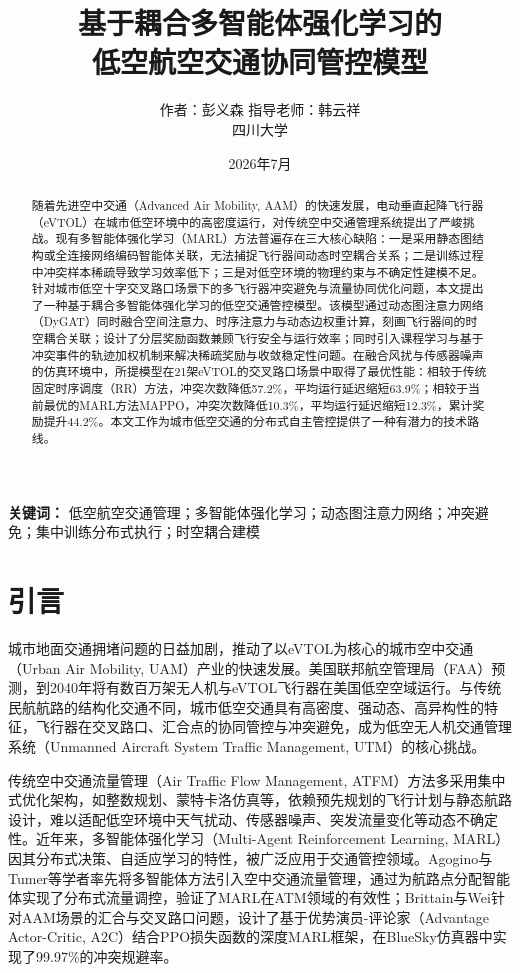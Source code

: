 \documentclass[12pt,a4paper,UTF8]{ctexart}
\title{\textbf{基于耦合多智能体强化学习的\\低空航空交通协同管控模型}}
\author{作者：彭义森 \quad 指导老师：韩云祥 \\ 四川大学}
\date{2026年7月}
\begin{document}
\maketitle

\begin{abstract}
随着先进空中交通（Advanced Air Mobility, AAM）的快速发展，电动垂直起降飞行器（eVTOL）在城市低空环境中的高密度运行，对传统空中交通管理系统提出了严峻挑战。现有多智能体强化学习（MARL）方法普遍存在三大核心缺陷：一是采用静态图结构或全连接网络编码智能体关联，无法捕捉飞行器间动态时空耦合关系；二是训练过程中冲突样本稀疏导致学习效率低下；三是对低空环境的物理约束与不确定性建模不足。针对城市低空十字交叉路口场景下的多飞行器冲突避免与流量协同优化问题，本文提出了一种基于耦合多智能体强化学习的低空交通管控模型。该模型通过动态图注意力网络（DyGAT）同时融合空间注意力、时序注意力与动态边权重计算，刻画飞行器间的时空耦合关联；设计了分层奖励函数兼顾飞行安全与运行效率；同时引入课程学习与基于冲突事件的轨迹加权机制来解决稀疏奖励与收敛稳定性问题。在融合风扰与传感器噪声的仿真环境中，所提模型在21架eVTOL的交叉路口场景中取得了最优性能：相较于传统固定时序调度（RR）方法，冲突次数降低57.2\%，平均运行延迟缩短63.9\%；相较于当前最优的MARL方法MAPPO，冲突次数降低10.3\%，平均运行延迟缩短12.3\%，累计奖励提升44.2\%。本文工作为城市低空交通的分布式自主管控提供了一种有潜力的技术路线。
\end{abstract}

\noindent \textbf{关键词：} 低空航空交通管理；多智能体强化学习；动态图注意力网络；冲突避免；集中训练分布式执行；时空耦合建模

\section{引言}
城市地面交通拥堵问题的日益加剧，推动了以eVTOL为核心的城市空中交通（Urban Air Mobility, UAM）产业的快速发展。美国联邦航空管理局（FAA）预测，到2040年将有数百万架无人机与eVTOL飞行器在美国低空空域运行。与传统民航航路的结构化交通不同，城市低空交通具有高密度、强动态、高异构性的特征，飞行器在交叉路口、汇合点的协同管控与冲突避免，成为低空无人机交通管理系统（Unmanned Aircraft System Traffic Management, UTM）的核心挑战。

传统空中交通流量管理（Air Traffic Flow Management, ATFM）方法多采用集中式优化架构，如整数规划、蒙特卡洛仿真等，依赖预先规划的飞行计划与静态航路设计，难以适配低空环境中天气扰动、传感器噪声、突发流量变化等动态不确定性。近年来，多智能体强化学习（Multi-Agent Reinforcement Learning, MARL）因其分布式决策、自适应学习的特性，被广泛应用于交通管控领域。Agogino与Tumer等学者率先将多智能体方法引入空中交通流量管理，通过为航路点分配智能体实现了分布式流量调控，验证了MARL在ATM领域的有效性\cite{ref19,ref18}；Brittain与Wei针对AAM场景的汇合与交叉路口问题，设计了基于优势演员-评论家（Advantage Actor-Critic, A2C）结合PPO损失函数的深度MARL框架，在BlueSky仿真器中实现了99.97\%的冲突规避率\cite{ref12}。
\end{document}
